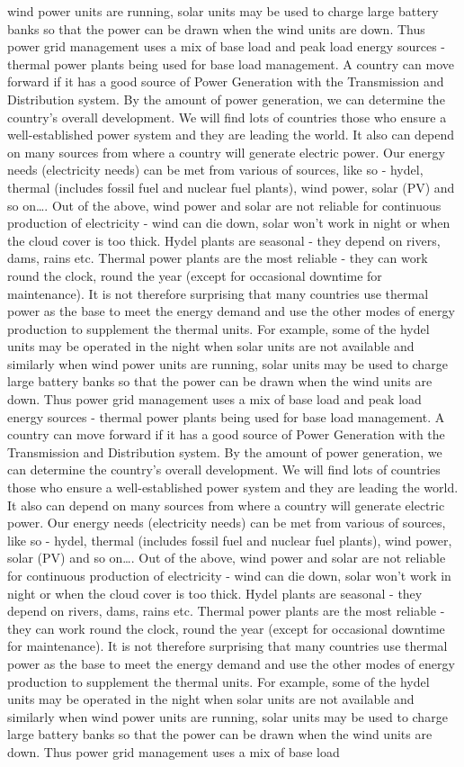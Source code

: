 \documentclass[10pt, a4paper]{article}
\begin{document}
wind power units are running, solar units may be used to charge large battery banks so that the power can be drawn when the wind units are down. Thus power grid management uses a mix of base load and peak load energy sources - thermal power plants being used for base load management. A country can move forward if it has a good source of Power Generation with the Transmission and Distribution system. By the amount of power generation, we can determine the country’s overall development. We will find lots of countries those who ensure a well-established power system and they are leading the world. It also can depend on many sources from where a country will generate electric power. Our energy needs (electricity needs) can be met from various of sources, like so - hydel, thermal (includes fossil fuel and nuclear fuel plants), wind power, solar (PV) and so on\dots. Out of the above, wind power and solar are not reliable for continuous production of electricity - wind can die down, solar won’t work in night or when the cloud cover is too thick. Hydel plants are seasonal - they depend on rivers, dams, rains etc. Thermal power plants are the most reliable - they can work round the clock, round the year (except for occasional downtime for maintenance). It is not therefore surprising that many countries use thermal power as the base to meet the energy demand and use the other modes of energy production to supplement the thermal units. For example, some of the hydel units may be operated in the night when solar units are not available and similarly when wind power units are running, solar units may be used to charge large battery banks so that the power can be drawn when the wind units are down. Thus power grid management uses a mix of base load and peak load energy sources - thermal power plants being used for base load management. A country can move forward if it has a good source of Power Generation with the Transmission and Distribution system. By the amount of power generation, we can determine the country’s overall development. We will find lots of countries those who ensure a well-established power system and they are leading the world. It also can depend on many sources from where a country will generate electric power. Our energy needs (electricity needs) can be met from various of sources, like so - hydel, thermal (includes fossil fuel and nuclear fuel plants), wind power, solar (PV) and so on\dots. Out of the above, wind power and solar are not reliable for continuous production of electricity - wind can die down, solar won’t work in night or when the cloud cover is too thick. Hydel plants are seasonal - they depend on rivers, dams, rains etc. Thermal power plants are the most reliable - they can work round the clock, round the year (except for occasional downtime for maintenance). It is not therefore surprising that many countries use thermal power as the base to meet the energy demand and use the other modes of energy production to supplement the thermal units. For example, some of the hydel units may be operated in the night when solar units are not available and similarly when wind power units are running, solar units may be used to charge large battery banks so that the power can be drawn when the wind units are down. Thus power grid management uses a mix of base load 
\end{document}
